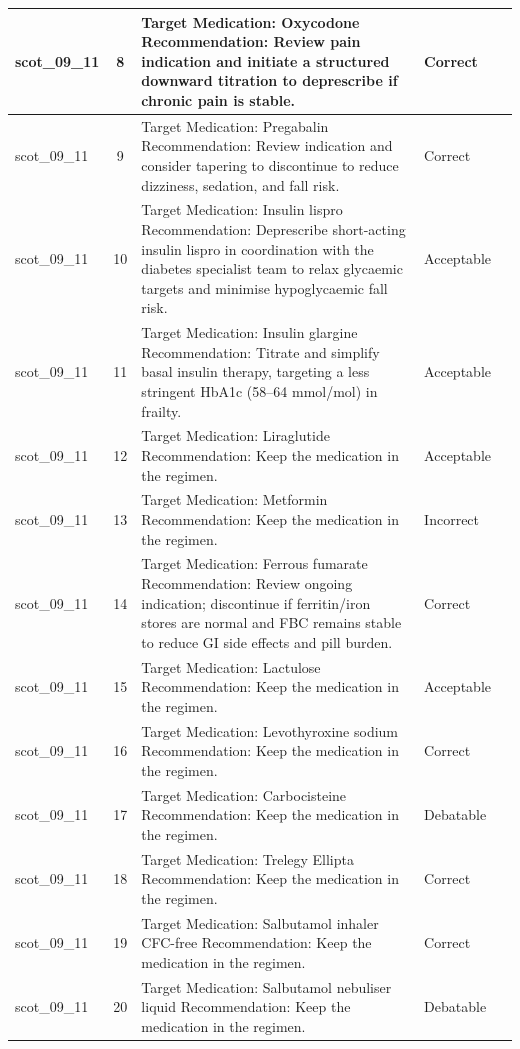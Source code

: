 \begin{longtable}{|p{1.45cm}|c|p{10.2cm}|p{1.55cm}|p{2.3cm}|}
\hline
scot\_09\_11 & 8 & Target Medication: Oxycodone Recommendation: Review pain indication and initiate a structured downward titration to deprescribe if chronic pain is stable. & Correct &  \\
\hline
scot\_09\_11 & 9 & Target Medication: Pregabalin Recommendation: Review indication and consider tapering to discontinue to reduce dizziness, sedation, and fall risk. & Correct &  \\
\hline
scot\_09\_11 & 10 & Target Medication: Insulin lispro Recommendation: Deprescribe short-acting insulin lispro in coordination with the diabetes specialist team to relax glycaemic targets and minimise hypoglycaemic fall risk. & Acceptable &  \\
\hline
scot\_09\_11 & 11 & Target Medication: Insulin glargine Recommendation: Titrate and simplify basal insulin therapy, targeting a less stringent HbA1c (58–64 mmol/mol) in frailty. & Acceptable &  \\
\hline
scot\_09\_11 & 12 & Target Medication: Liraglutide Recommendation: Keep the medication in the regimen. & Acceptable &  \\
\hline
scot\_09\_11 & 13 & Target Medication: Metformin Recommendation: Keep the medication in the regimen. & Incorrect &  \\
\hline
scot\_09\_11 & 14 & Target Medication: Ferrous fumarate Recommendation: Review ongoing indication; discontinue if ferritin/iron stores are normal and FBC remains stable to reduce GI side effects and pill burden. & Correct &  \\
\hline
scot\_09\_11 & 15 & Target Medication: Lactulose Recommendation: Keep the medication in the regimen. & Acceptable &  \\
\hline
scot\_09\_11 & 16 & Target Medication: Levothyroxine sodium Recommendation: Keep the medication in the regimen. & Correct &  \\
\hline
scot\_09\_11 & 17 & Target Medication: Carbocisteine Recommendation: Keep the medication in the regimen. & Debatable &  \\
\hline
scot\_09\_11 & 18 & Target Medication: Trelegy Ellipta Recommendation: Keep the medication in the regimen. & Correct &  \\
\hline
scot\_09\_11 & 19 & Target Medication: Salbutamol inhaler CFC-free Recommendation: Keep the medication in the regimen. & Correct &  \\
\hline
scot\_09\_11 & 20 & Target Medication: Salbutamol nebuliser liquid Recommendation: Keep the medication in the regimen. & Debatable &  \\

\end{longtable}
